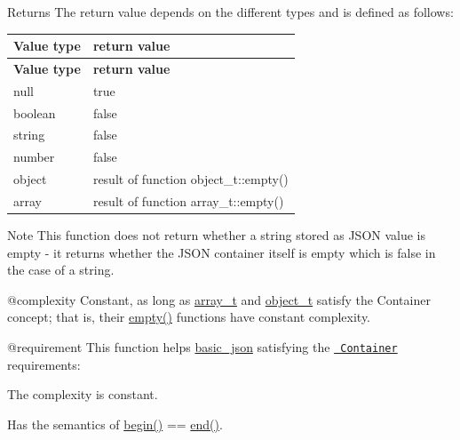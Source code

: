 \begin{DoxyReturn}{Returns}
The return value depends on the different types and is defined as follows\+: \tabulinesep=1mm
\begin{longtabu}spread 0pt [c]{*{2}{|X[-1]}|}
\hline
\PBS\centering \cellcolor{\tableheadbgcolor}\textbf{ Value type  }&\PBS\centering \cellcolor{\tableheadbgcolor}\textbf{ return value   }\\
\endfirsthead
\hline
\endfoot
\hline
\PBS\centering \cellcolor{\tableheadbgcolor}\textbf{ Value type  }&\PBS\centering \cellcolor{\tableheadbgcolor}\textbf{ return value   }\\
\endhead
null  &{\ttfamily true}   \\
boolean  &{\ttfamily false}   \\
string  &{\ttfamily false}   \\
number  &{\ttfamily false}   \\
object  &result of function {\ttfamily object\+\_\+t\+::empty()}   \\
array  &result of function {\ttfamily array\+\_\+t\+::empty()}   \\
\end{longtabu}

\end{DoxyReturn}
\begin{DoxyNote}{Note}
This function does not return whether a string stored as J\+S\+ON value is empty -\/ it returns whether the J\+S\+ON container itself is empty which is false in the case of a string.
\end{DoxyNote}
@complexity Constant, as long as \mbox{\hyperlink{classnlohmann_1_1basic__json_ae095578e03df97c5b3991787f1056374}{array\+\_\+t}} and \mbox{\hyperlink{classnlohmann_1_1basic__json_aa1eb13d5aa86f80cbee6c58e90fbaf49}{object\+\_\+t}} satisfy the Container concept; that is, their {\ttfamily \mbox{\hyperlink{classnlohmann_1_1basic__json_a1a86d444bfeaa9518d2421aedd74444a}{empty()}}} functions have constant complexity.

@requirement This function helps {\ttfamily \mbox{\hyperlink{classnlohmann_1_1basic__json}{basic\+\_\+json}}} satisfying the \href{http://en.cppreference.com/w/cpp/concept/Container}{\texttt{ Container}} requirements\+:
\begin{DoxyItemize}
\item The complexity is constant.
\item Has the semantics of {\ttfamily \mbox{\hyperlink{classnlohmann_1_1basic__json_a0ff28dac23f2bdecee9564d07f51dcdc}{begin()}} == \mbox{\hyperlink{classnlohmann_1_1basic__json_a13e032a02a7fd8a93fdddc2fcbc4763c}{end()}}}.
\end{DoxyItemize}

